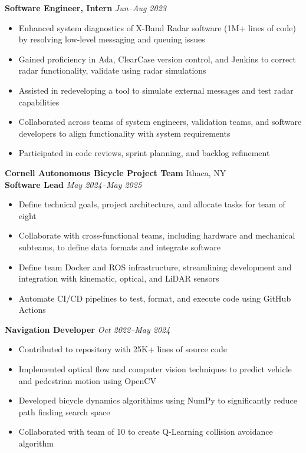 \documentclass[letterpaper,10pt]{article}
\newcommand{\company}[2]{
    \vspace{7pt}
    {\large \textbf{#1}}
    \hfill
    {\normalsize {#2}}
    \\
}
\newcommand{\position}[2]{
    \vspace{5pt}
    {\normalsize \textbf {#1}}
    \hfill
    {\normalsize \textit{#2}}
    \\
}
\newcommand{\itemsBegin}{
    \begin{itemize}[leftmargin=0.2in, labelsep=0.05in, itemsep=0pt, parsep=1pt, topsep=0pt, partopsep=0pt]
    \small
}
\newcommand{\itemsEnd}{\end{itemize}}
\begin{document}
    \position{Software Engineer, Intern}{Jun--Aug 2023}
    \itemsBegin{}
        \item Enhanced system diagnostics of X-Band Radar software (1M+ lines of code) by resolving low-level messaging and queuing issues
        \item Gained proficiency in Ada, ClearCase version control, and Jenkins to correct radar functionality, validate using radar simulations
        \item Assisted in redeveloping a tool to simulate external messages and test radar capabilities
        \item Collaborated across teams of system engineers, validation teams, and software developers to align functionality with system requirements
        \item Participated in code reviews, sprint planning, and backlog refinement
    \itemsEnd{}

    \company{Cornell Autonomous Bicycle Project Team}{Ithaca, NY}

    \position{Software Lead}{May 2024--May 2025}
    \itemsBegin{}
        \item Define technical goals, project architecture, and allocate tasks for team of eight
        \item Collaborate with cross-functional teams, including hardware and mechanical subteams, to define data formats and integrate software
        \item Define team Docker and ROS infrastructure, streamlining development and integration with kinematic, optical, and LiDAR sensors
        \item Automate CI/CD pipelines to test, format, and execute code using GitHub Actions
    \itemsEnd{}

    \position{Navigation Developer}{Oct 2022--May 2024}
    \itemsBegin{}
        \item Contributed to repository with 25K+ lines of source code
        \item Implemented optical flow and computer vision techniques to predict vehicle and pedestrian motion using OpenCV
        \item Developed bicycle dynamics algorithims using NumPy to significantly reduce path finding search space
        \item Collaborated with team of 10 to create Q-Learning collision avoidance algorithm
    \itemsEnd{}

\end{document}

